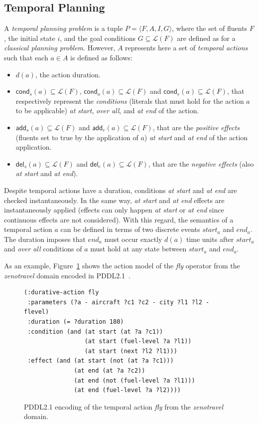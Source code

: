 \documentclass[letterpaper]{article} %
\newcommand{\tup}[1]{{\langle #1 \rangle}}
\newcommand{\del}{\mathsf{del}}     %
\newcommand{\add}{\mathsf{add}}     %
\newcommand{\cond}{\mathsf{cond}}   %
\begin{document}
\subsection{Temporal Planning}
A {\em temporal planning problem} is a tuple $P=\tup{F,A,I,G}$, where the set of fluents $F$, the initial state $i$, and the goal conditions $G\subseteq\mathcal{L}(F)$ are defined as for a {\em classical planning problem}. However, $A$ represents here a set of {\em temporal actions} such that each $a\in A$ is defined as follows:
\begin{itemize}
\item $d(a)$, the action duration.
\item $\cond_s(a)\subseteq\mathcal{L}(F)$, $\cond_o(a)\subseteq\mathcal{L}(F)$ and $\cond_e(a)\subseteq\mathcal{L}(F)$, that respectively represent the {\em conditions} (literals that must hold for the action $a$ to be applicable) {\em at start}, {\em over all}, and {\em at end} of the action.

\item $\add_s(a)\subseteq\mathcal{L}(F)$ and $\add_e(a)\subseteq\mathcal{L}(F)$, that are the {\em positive effects} (fluents set to true by the application of $a$) {\em at start} and {\em at end} of the action application.
\item  $\del_s(a)\subseteq\mathcal{L}(F)$ and $\del_e(a)\subseteq\mathcal{L}(F)$, that are the {\em negative effects} (also {\em at start} and {\em at end}).
\end{itemize}
Despite temporal actions have a duration, conditions {\em at start} and {\em at end} are checked instantaneously. In the same way, {\em at start} and {\em at end} effects are instantaneously applied (effects can only happen {\em at start} or {\em at end} since continuous effects are not considered). With this regard, the semantics of a temporal action $a$ can be defined in terms of two discrete events $start_a$ and $end_a$. The duration imposes that $end_a$ must occur exactly $d(a)$ time units after $start_a$ and {\em over all} conditions of $a$ must hold at any state between $start_a$ and $end_a$. 

As an example, Figure~\ref{fig:flyt} shows the action model of the {\em fly} operator from the {\em zenotravel} domain encoded in PDDL2.1~\cite{fox2003pddl2}.

\begin{figure}[hbt!]
	\begin{scriptsize}
		\begin{verbatim}
(:durative-action fly 
 :parameters (?a - aircraft ?c1 ?c2 - city ?l1 ?l2 - flevel)
 :duration (= ?duration 180)
 :condition (and (at start (at ?a ?c1))
                 (at start (fuel-level ?a ?l1))
                 (at start (next ?l2 ?l1)))
 :effect (and (at start (not (at ?a ?c1)))
              (at end (at ?a ?c2))
              (at end (not (fuel-level ?a ?l1)))
              (at end (fuel-level ?a ?l2)))) 
		\end{verbatim}
	\end{scriptsize}
	\caption{PDDL2.1 encoding of the temporal action {\em fly} from the {\em zenotravel} domain.}
	\label{fig:flyt}
\end{figure}
\end{document}
